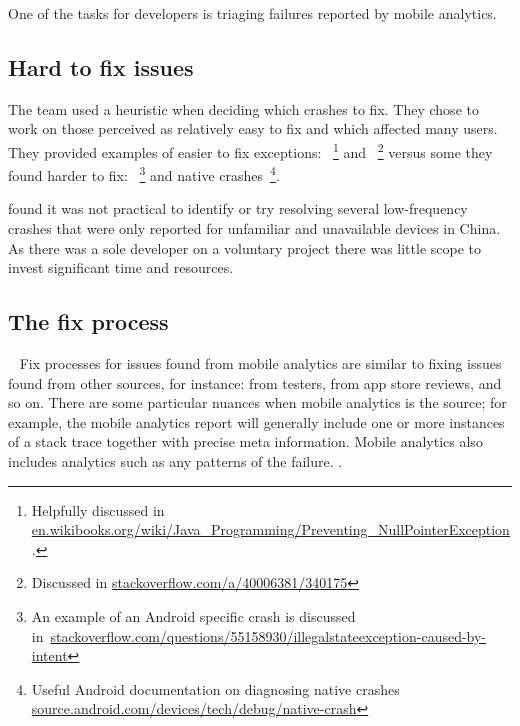 One of the tasks for developers is triaging failures reported by mobile analytics. 

\subsection{Hard to fix issues}
The  team used a heuristic when deciding which crashes to fix. They chose to work on those perceived as relatively easy to fix and which affected many users. They provided examples of easier to fix exceptions: ~\footnote{Helpfully discussed in \href{https://en.wikibooks.org/wiki/Java\_Programming/Preventing\_NullPointerException}{en.wikibooks.org/wiki/Java\_Programming/Preventing\_NullPointerException}.} and ~\footnote{Discussed in \href{https://stackoverflow.com/a/40006381/340175}{stackoverflow.com/a/40006381/340175}} versus some they found harder to fix: ~\footnote{An example of an Android specific crash is discussed in~\href{https://stackoverflow.com/questions/55158930/illegalstateexception-caused-by-intent}{stackoverflow.com/questions/55158930/illegalstateexception-caused-by-intent}} and native crashes~\footnote{Useful Android documentation on diagnosing native crashes \href{https://source.android.com/devices/tech/debug/native-crash}{source.android.com/devices/tech/debug/native-crash}}.

 found it was not practical to identify or try resolving several low-frequency crashes that were only reported for unfamiliar and unavailable devices in China. As there was a sole developer on a voluntary project there was little scope to invest significant time and resources.

\subsection{The fix process}~\label{aiu-the-fix-process-topic}
Fix processes for issues found from mobile analytics are similar to fixing issues found from other sources, for instance: from testers, from app store reviews, and so on. There are some particular nuances when mobile analytics is the source; for example, the mobile analytics report will generally include one or more instances of a stack trace together with precise meta information. Mobile analytics also includes analytics such as any patterns of the failure. . 

